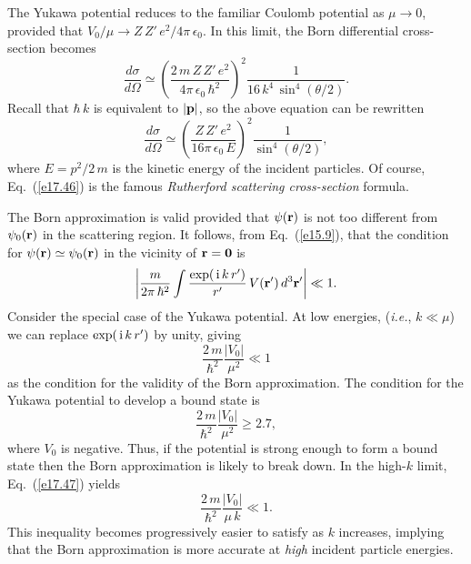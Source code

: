The Yukawa potential reduces to the familiar Coulomb potential as
$\mu \rightarrow 0$, provided that $V_0/\mu \rightarrow
Z\,Z'\, e^2 / 4\pi\,\epsilon_0$. In this limit, the Born differential cross-section becomes
\begin{equation}
\frac{d\sigma}{d\Omega} \simeq \left(\frac{2\,m \,Z\, Z'\, e^2}{4\pi\,\epsilon_0\,\hbar^2}\right)^2
\frac{1}{ 16 \,k^4\, \sin^4( \theta/2)}.
\end{equation}
Recall that $\hbar\, k$ is equivalent to $|{\bf p}|$, so the above
equation can be rewritten 
\begin{equation}\label{e17.46}
 \frac{d\sigma}{d\Omega} \simeq\left(\frac{Z \,Z'\, e^2}{16\pi\,\epsilon_0\,E}\right)^2
\frac{1}{\sin^4(\theta/2)},
\end{equation}
where $E= p^2/2\,m$ is the kinetic energy of the incident particles. 
Of course, Eq.~(\ref{e17.46}) is  the famous  {\em Rutherford scattering cross-section} formula.

The Born approximation is valid provided that $\psi({\bf r})$ is
not too different from $\psi_0({\bf r})$ in the scattering region. 
It follows, from Eq.~(\ref{e15.9}), that the condition for  $\psi({\bf r})
\simeq \psi_0({\bf r})$ in the vicinity of ${\bf r} = {\bf 0}$ is 
\begin{equation}\label{e17.47}
\left| \frac{m}{2\pi\, \hbar^2} \int \frac{ \exp(\,{\rm i}\, k \,r')}{r'} 
\,V({\bf r}')\,d^3{\bf r'} \right| \ll 1.
\end{equation}
 Consider the special case of the Yukawa potential. At low energies,
({\em i.e.}, $k\ll \mu$) we can replace $\exp(\,{\rm i}\,k\, r')$ by unity,
giving
\begin{equation}
\frac{2\,m}{\hbar^2} \frac{|V_0|}{\mu^2} \ll 1
\end{equation}
as the condition for the validity of the Born approximation.
The condition for the Yukawa potential to develop a bound state
is
\begin{equation}
\frac{2\,m}{\hbar^2} \frac{|V_0|} {\mu^2} \geq 2.7,
\end{equation}
where $V_0$ is negative. Thus, if the potential is strong enough to
form a bound state then the Born approximation is likely to break
down. In the high-$k$ limit, Eq.~(\ref{e17.47}) yields
\begin{equation}
\frac{2\,m}{\hbar^2} \frac{|V_0|}{\mu \,k} \ll 1.
\end{equation}
This inequality becomes progressively easier to satisfy as $k$ increases,
implying that the Born approximation is more accurate at {\em high}\/
incident particle energies.

